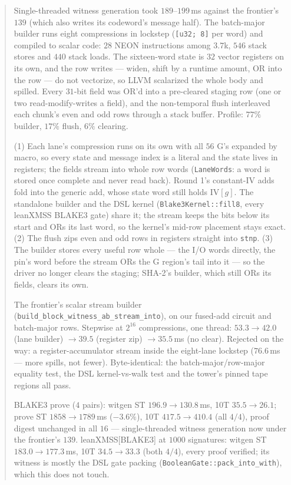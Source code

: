 \documentclass[11pt]{article}
\newcommand{\code}[1]{\texttt{#1}}
\newenvironment{optsummary}{%
  \begin{quote}\small
  \begin{description}
  \setlength{\itemsep}{1pt}\setlength{\parsep}{0pt}\setlength{\topsep}{2pt}
}{%
  \end{description}
  \end{quote}
}
\begin{document}
\begin{optsummary}
\item[Baseline:] Single-threaded witness generation took $189$--$199\,$ms against the frontier's $139$ (which also writes its codeword's message half). The batch-major builder runs eight compressions in lockstep (\code{[u32; 8]} per word) and compiled to scalar code: $28$ NEON instructions among $3.7$k, $546$ stack stores and $440$ stack loads. The sixteen-word state is $32$ vector registers on its own, and the row writes --- widen, shift by a runtime amount, OR into the row --- do not vectorize, so LLVM scalarized the whole body and spilled. Every $31$-bit field was OR'd into a pre-cleared staging row (one or two read-modify-writes a field), and the non-temporal flush interleaved each chunk's even and odd rows through a stack buffer. Profile: $77\%$ builder, $17\%$ flush, $6\%$ clearing.
\item[Improvement:] (1) Each lane's compression runs on its own with all $56$ G's expanded by macro, so every state and message index is a literal and the state lives in registers; the fields stream into whole row words (\code{LaneWords}: a word is stored once complete and never read back). Round 1's constant-IV adds fold into the generic add, whose state word still holds $\mathrm{IV}[g]$. The standalone builder and the DSL kernel (\code{Blake3Kernel::fill8}, every leanXMSS BLAKE3 gate) share it; the stream keeps the bits below its start and ORs its last word, so the kernel's mid-row placement stays exact. (2) The flush zips even and odd rows in registers straight into \code{stnp}. (3) The builder stores every useful row whole --- the I/O words directly, the pin's word before the stream ORs the G region's tail into it --- so the driver no longer clears the staging; SHA-2's builder, which still ORs its fields, clears its own.
\item[Mechanism:] The frontier's scalar stream builder (\code{build\_block\_witness\_ab\_stream\_into}), on our fused-add circuit and batch-major rows. Stepwise at $2^{16}$ compressions, one thread: $53.3\to42.0$ (lane builder) $\to39.5$ (register zip) $\to35.5\,$ms (no clear). Rejected on the way: a register-accumulator stream inside the eight-lane lockstep ($76.6\,$ms --- more spills, not fewer). Byte-identical: the batch-major/row-major equality test, the DSL kernel-vs-walk test and the tower's pinned tape regions all pass.
\item[Result:] BLAKE3 prove ($4$ pairs): witgen ST $196.9\to130.8\,$ms, 10T $35.5\to26.1$; prove ST $1858\to1789\,$ms ($-3.6\%$), 10T $417.5\to410.4$ (all $4/4$), proof digest unchanged in all $16$ --- single-threaded witness generation now under the frontier's $139$. leanXMSS[BLAKE3] at $1000$ signatures: witgen ST $183.0\to177.3\,$ms, 10T $34.5\to33.3$ (both $4/4$), every proof verified; its witness is mostly the DSL gate packing (\code{BooleanGate::pack\_into\_with}), which this does not touch.
\end{optsummary}
\end{document}
